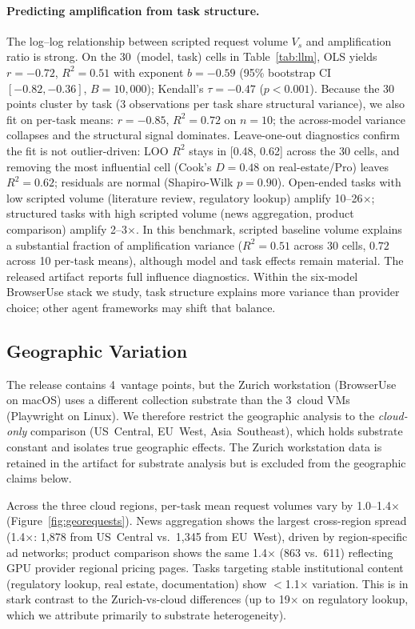 \documentclass[10pt,sigconf,letterpaper,anonymous,nonacm]{acmart}
\begin{document}
\paragraph{Predicting amplification from task structure.}
The log--log relationship between scripted request volume $V_s$ and
amplification ratio is strong.  On the 30~(model, task) cells in
Table~\ref{tab:llm}, OLS yields $r = -0.72$, $R^2 = 0.51$ with exponent
$b = -0.59$ (95\% bootstrap CI $[-0.82, -0.36]$, $B=10{,}000$); Kendall's
$\tau = -0.47$ ($p < 0.001$).  Because the 30 points cluster by task
(3 observations per task share structural variance), we also fit on
per-task means: $r = -0.85$, $R^2 = 0.72$ on $n=10$; the across-model
variance collapses and the structural signal dominates.  Leave-one-out
diagnostics confirm the fit is not outlier-driven: LOO $R^2$ stays in
[0.48, 0.62] across the 30 cells, and removing the most influential
cell (Cook's $D = 0.48$ on real-estate/Pro) leaves $R^2 = 0.62$;
residuals are normal (Shapiro-Wilk $p = 0.90$).  Open-ended tasks with
low scripted volume (literature review, regulatory lookup) amplify
10--26$\times$; structured tasks with high scripted volume (news
aggregation, product comparison) amplify 2--3$\times$.  In this
benchmark, scripted baseline volume explains a substantial fraction
of amplification variance ($R^2=0.51$ across 30 cells, $0.72$ across
10 per-task means), although model and task effects remain material.
The released artifact reports full influence diagnostics.
Within the six-model BrowserUse stack we study, task structure
explains more variance than provider choice; other agent frameworks
may shift that balance.

\subsection{Geographic Variation}
\label{sec:obs-geo}

The release contains 4~vantage points, but the Zurich workstation
(BrowserUse on macOS) uses a different collection substrate than the
3~cloud VMs (Playwright on Linux).  We therefore restrict the
geographic analysis to the \emph{cloud-only} comparison
(US~Central, EU~West, Asia~Southeast), which holds substrate constant
and isolates true geographic effects.  The Zurich workstation data
is retained in the artifact for substrate analysis but is excluded
from the geographic claims below.

Across the three cloud regions, per-task mean request volumes vary by
1.0--1.4$\times$ (Figure~\ref{fig:georequests}).  News aggregation
shows the largest cross-region spread (1.4$\times$: 1{,}878 from
US~Central vs.\ 1{,}345 from EU~West), driven by region-specific ad
networks; product comparison
shows the same 1.4$\times$ (863 vs.\ 611) reflecting GPU
provider regional pricing pages.  Tasks targeting stable institutional
content (regulatory lookup, real estate, documentation) show
$<$1.1$\times$ variation.  This is in stark contrast to the
Zurich-vs-cloud differences (up to 19$\times$ on regulatory lookup,
which we attribute primarily to substrate heterogeneity).
\end{document}
